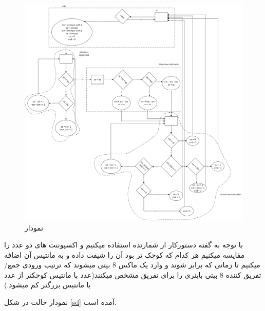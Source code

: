 \documentclass[fleqn]{article}
\begin{document}
\begin{figure}[!htbp]
    \includegraphics[width=\textwidth]{Assets/ASM.png}
    \caption{نمودار }
    \label{asm}
\end{figure}

با توجه به گفته دستورکار از شمارنده استفاده میکنیم و  اکسپوننت های دو عدد را مقایسه میکنیم هر کدام که کوچک تر بود آن را شیفت داده و به مانتیس آن اضافه میکنیم تا زمانی که برابر شوند و وارد یک ماکس 8 بیتی میشوند که ترتیب ورودی جمع/تفریق کننده 8 بیتی باینری را برای تفریق مشخص میکنند(عدد با مانتیس کوچکتر از عدد با مانتیس بزرگتر کم میشود.)

نمودار حالت در شکل 
\ref{sd}
آمده است. 
\end{document}
